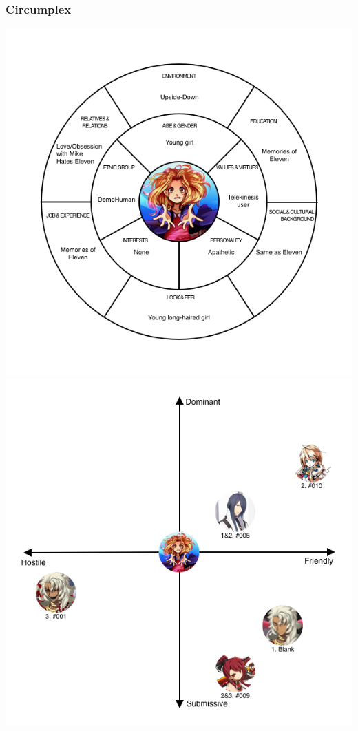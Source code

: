 \subsubsection{Circumplex}
\begin{center}
	\includegraphics[width=0.76\linewidth]{images/graphs/characters/bad_eleven_circumplex.png}
	\includegraphics[width=0.76\linewidth]{images/graphs/characters/bad_eleven_map_of_relations.png}
\end{center}

